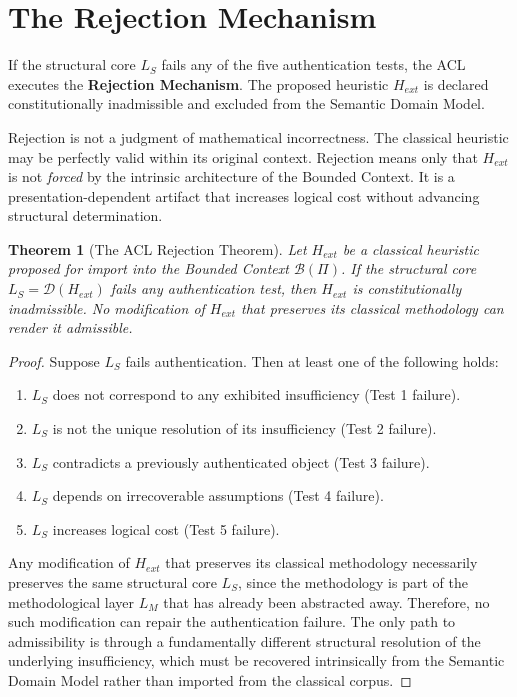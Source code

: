 \documentclass[12pt,openany]{extbook}
\theoremstyle{plain}
\newtheorem{theorem}{Theorem}[chapter]
\theoremstyle{definition}
\begin{document}
\section{The Rejection Mechanism}

If the structural core $L_S$ fails any of the five authentication tests, the ACL executes the \textbf{Rejection Mechanism}. The proposed heuristic $H_{ext}$ is declared constitutionally inadmissible and excluded from the Semantic Domain Model.

Rejection is not a judgment of mathematical incorrectness. The classical heuristic may be perfectly valid within its original context. Rejection means only that $H_{ext}$ is not \emph{forced} by the intrinsic architecture of the Bounded Context. It is a presentation-dependent artifact that increases logical cost without advancing structural determination.

\begin{theorem}[The ACL Rejection Theorem]
Let $H_{ext}$ be a classical heuristic proposed for import into the Bounded Context $\mathcal{B}(\Pi)$. If the structural core $L_S = \mathcal{D}(H_{ext})$ fails any authentication test, then $H_{ext}$ is constitutionally inadmissible. No modification of $H_{ext}$ that preserves its classical methodology can render it admissible.
\end{theorem}

\begin{proof}
Suppose $L_S$ fails authentication. Then at least one of the following holds:
\begin{enumerate}
    \item $L_S$ does not correspond to any exhibited insufficiency (Test 1 failure).
    \item $L_S$ is not the unique resolution of its insufficiency (Test 2 failure).
    \item $L_S$ contradicts a previously authenticated object (Test 3 failure).
    \item $L_S$ depends on irrecoverable assumptions (Test 4 failure).
    \item $L_S$ increases logical cost (Test 5 failure).
\end{enumerate}
Any modification of $H_{ext}$ that preserves its classical methodology necessarily preserves the same structural core $L_S$, since the methodology is part of the methodological layer $L_M$ that has already been abstracted away. Therefore, no such modification can repair the authentication failure. The only path to admissibility is through a fundamentally different structural resolution of the underlying insufficiency, which must be recovered intrinsically from the Semantic Domain Model rather than imported from the classical corpus.
\end{proof}
\end{document}
